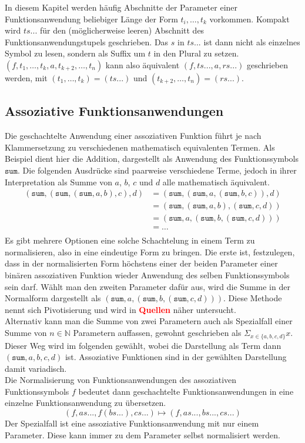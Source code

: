 \documentclass{scrartcl}
\numberwithin{figure}{section} %
\theoremstyle{definition} %
\newcommand{\elems}[3]{{#1}_{#2}, \dots, {#1}_{#3}}
\begin{document}
In diesem Kapitel werden häufig Abschnitte der Parameter einer Funktionsanwendung beliebiger Länge der Form $\elems t i k$ vorkommen. Kompakt wird $ts...$ für den (möglicher\-weise leeren) Abschnitt des Funktionsanwendungstupels geschrieben. Das $s$ in $ts...$ ist dann nicht als einzelnes Symbol zu lesen, sondern als Suffix um $t$ in den Plural zu setzen. \\$(f, \elems t 1 k, a, \elems t {k+2} n)$ kann also äquivalent $(f, ts..., a, rs...)$ geschrieben werden, mit $(\elems t 1 k) = (ts...)$ und $(\elems t {k+2} n) = (rs...)$.\\

\subsection {Assoziative Funktionsanwendungen}
Die geschachtelte Anwendung einer assoziativen Funktion führt je nach Klammersetzung zu verschiedenen mathematisch equivalenten Termen. Als Beispiel dient hier die Addition, dargestellt als Anwendung des Funktionssymbols $\texttt{sum}$. Die folgenden Ausdrücke sind paarweise verschiedene Terme, jedoch in ihrer Interpretation als Summe von $a$, $b$, $c$ und $d$ alle mathematisch äquivalent.
\begin{equation*}
	\begin{split}
	   (\texttt{sum}, (\texttt{sum}, (\texttt{sum}, a, b), c), d) 
    &= (\texttt{sum}, (\texttt{sum}, a, (\texttt{sum}, b, c)), d)\\
	&= (\texttt{sum}, (\texttt{sum}, a, b), (\texttt{sum}, c, d))\\
	&= (\texttt{sum}, a, (\texttt{sum}, b, (\texttt{sum}, c, d)))\\
	&= \dots \\
	\end{split}
\end{equation*}
Es gibt mehrere Optionen eine solche Schachtelung in einem Term zu normalisieren, also in eine eindeutige Form zu bringen. Die erste ist, festzulegen, dass in der normalisierten Form höchstens einer der beiden Parameter einer binären assoziativen Funktion wieder Anwendung des selben Funktionssymbols sein darf. Wählt man den zweiten Parameter dafür aus, wird die Summe in der Normalform dargestellt als $(\texttt{sum}, a, (\texttt{sum}, b, (\texttt{sum}, c, d)))$. Diese Methode nennt sich Pivotisierung und wird in \textcolor{red}{\textbf{Quellen}} näher untersucht.\\
Alternativ kann man die Summe von zwei Parametern auch als Spezialfall einer Summe von $n \in \mathbb{N}$ Parametern auffassen, gewohnt geschrieben als $\Sigma_{x \in \{a, b, c, d\}} x$. Dieser Weg wird im folgenden gewählt, wobei die Darstellung als Term dann $(\texttt{sum}, a, b, c, d)$ ist. Assoziative Funktionen sind in der gewählten Darstellung damit variadisch. \\
Die Normalisierung von Funktionsanwendungen des assoziativen Funktionssymbols $f$ bedeutet dann geschachtelte Funktionsanwendungen in eine einzelne Funktionsanwendung zu übersetzen. 
$$(f, as..., f(bs...), cs...) \mapsto (f, as..., bs..., cs...)$$
Der Spezialfall ist eine assoziative Funktionsanwendung mit nur einem Parameter. Diese kann immer zu dem Parameter selbst normalisiert werden. 
\end{document}
